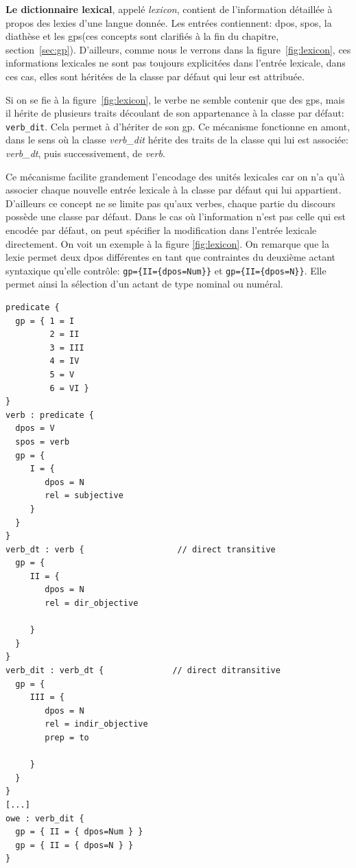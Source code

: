 \textbf{Le dictionnaire lexical}, appelé \emph{lexicon}, contient de l'information détaillée à propos des lexies d'une langue donnée. Les entrées contiennent: \ac{dpos}, \ac{spos}, la diathèse et les \acp{gp}(ces concepts sont clarifiés à la fin du chapitre, section~\ref{sec:gp}). D'ailleurs, comme nous le verrons dans la figure~\ref{fig:lexicon}, ces informations lexicales ne sont pas toujours explicitées dans l'entrée lexicale, dans ces cas, elles sont héritées de la classe par défaut qui leur est attribuée.

Si on se fie à la figure~\ref{fig:lexicon}, le verbe  ne semble contenir que des \acp{gp}, mais il hérite de plusieurs traits découlant de son appartenance à la classe par défaut: \texttt{verb\_dit}. Cela permet à  d'hériter de son \ac{gp}. Ce mécanisme fonctionne en amont, dans le sens où la classe \emph{verb\_dit} hérite des traits de la classe qui lui est associée: \emph{verb\_dt}, puis successivement, de \emph{verb}.

Ce mécanisme facilite grandement l'encodage des unités lexicales car on n'a qu'à associer chaque nouvelle entrée lexicale à la classe par défaut qui lui appartient. D'ailleurs ce concept ne se limite pas qu'aux verbes, chaque partie du discours possède une classe par défaut. Dans le cas où l'information n'est pas celle qui est encodée par défaut, on peut spécifier la modification dans l'entrée lexicale directement. On voit un exemple à la figure \ref{fig:lexicon}. On remarque que la lexie  permet deux \ac{dpos} différentes en tant que contraintes du deuxième actant syntaxique qu'elle contrôle: \lstinline!gp={II={dpos=Num}}! et \lstinline!gp={II={dpos=N}}!. Elle permet ainsi la sélection d'un actant de type nominal ou numéral.

\begin{minipage}{\linewidth}
\begin{lstlisting}[language=Xml, caption = Échantillon du \emph{lexicon}, label=fig:lexicon]
predicate {
  gp = { 1 = I
         2 = II
         3 = III
         4 = IV
         5 = V
         6 = VI }
}
verb : predicate {
  dpos = V
  spos = verb
  gp = {
     I = {
        dpos = N
        rel = subjective
     }
  }
}
verb_dt : verb {                   // direct transitive
  gp = {
     II = {
        dpos = N
        rel = dir_objective

     }
  }
}
verb_dit : verb_dt {              // direct ditransitive
  gp = {
     III = {
        dpos = N
        rel = indir_objective
        prep = to  

     }
  }
}
[...]
owe : verb_dit {
  gp = { II = { dpos=Num } }
  gp = { II = { dpos=N } }
}
\end{lstlisting}
\end{minipage}


